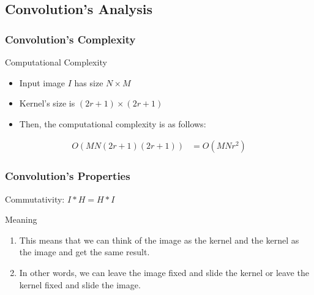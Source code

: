 \documentclass[english,11pt,table,handout]{beamer}
\begin{document}
\subsection{Convolution's Analysis}
\frame
{
	\frametitle{Convolution's Complexity}
	\begin{block}{Computational Complexity}
		\begin{itemize}
			\item Input image $I$ has size $N \times M$
			\item Kernel's size is $(2r+1) \times (2r+1)$
			\item Then, the computational complexity is as follows:
		\end{itemize}
		\begin{equation*}
			\begin{split}
				O(MN(2r+1)(2r+1)) &= O(MNr^2)
			\end{split}
		\end{equation*}
	\end{block}
	
}
\frame
{
	\frametitle{Convolution's Properties}
	\begin{block}{Commutativity:}
		\centering
		$I * H = H * I$
	\end{block}
	\begin{alertblock}{Meaning}
		\begin{enumerate}
			\item This means that we can think of the image as the kernel and the kernel as the image and get the same result. 
			
			\item In other words, we can leave the image fixed and slide the kernel or leave the kernel fixed and slide the image.
		\end{enumerate}		
		
	\end{alertblock}
}
\end{document}
